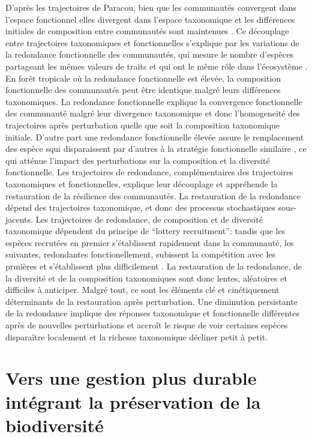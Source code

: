 \documentclass[
  11pt,
  french,
  A4paper,
  extrafontsizes,onecolumn,openright
  ]{memoir}
\begin{document}
D'après les trajectoires de Paracou, bien que les communautés convergent
dans l'espace fonctionnel elles divergent dans l'espace taxonomique et
les différences initiales de composition entre communautés sont
maintenues \autocite{Fukami2005}. Ce découplage entre trajectoires
taxonomiques et fonctionnelles s'explique par les variations de la
redondance fonctionnelle des communautés, qui mesure le nombre d'espèces
partageant les mêmes valeurs de traits et qui ont le même rôle dans
l'écosystème \autocite{Bellwood2006}. En forêt tropicale où la
redondance fonctionnelle est élevée, la composition fonctionnelle des
communautés peut être identique malgré leurs différences taxonomiques.
La redondance fonctionnelle explique la convergence fonctionnelle des
communauté malgré leur divergence taxonomique et donc l'homogeneité des
trajectoires après perturbation quelle que soit la composition
taxonomique initiale. D'autre part une redondance fonctionnelle élevée
assure le remplacement des espèce squi disparaissent par d'autres à la
stratégie fonctionnelle similaire \autocite{Carmona2016}, ce qui atténue
l'impact des perturbations sur la composition et la diversité
fonctionnelle. Les trajectoires de redondance, complémentaires des
trajectoires taxonomiques et fonctionnelles, explique leur découplage et
appréhende la restauration de la résilience des communautés. La
restauration de la redondance dépend des trajectoires taxonomique, et
donc des processus stochastiques sous-jacents. Les trajectoires de
redondance, de composition et de diversité taxonomique dépendent du
principe de ``lottery recruitment'': tandis que les espèces recrutées en
premier s'établissent rapidement dans la communauté, les suivantes,
redondantes fonctionellement, subissent la compétition avec les prmières
et s'établissent plus difficilement \autocite{Busing2002}. La
restauration de la redondance, de la diversité et de la composition
taxonomiques sont donc lentes, aléatoires et difficiles à anticiper.
Malgré tout, ce sont les éléments clé et cinétiquement déterminants de
la restauration après perturbation. Une diminution persistante de la
redondance implique des réponses taxonomique et fonctionnelle
différentes après de nouvelles perturbations et accroît le risque de
voir certaines espèces disparaître localement et la richesse taxonomique
décliner petit à petit.

\section{Vers une gestion plus durable intégrant la préservation de la
biodiversité}\label{vers-une-gestion-plus-durable-integrant-la-preservation-de-la-biodiversite}
\end{document}
